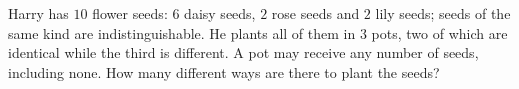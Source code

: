 Harry has $10$ flower seeds: $6$ daisy seeds, $2$ rose seeds and $2$ lily seeds; seeds of the same kind are indistinguishable. He plants all of them in $3$ pots, two of which are identical while the third is different. A pot may receive any number of seeds, including none. How many different ways are there to plant the seeds?

